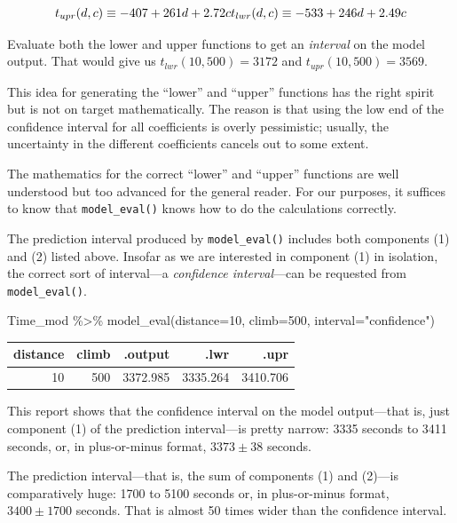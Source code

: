 \documentclass[
  letterpaper,
  DIV=11,
  numbers=noendperiod,
  oneside]{scrreprt}
\newenvironment{Shaded}{\begin{snugshade}}{\end{snugshade}}
\newcommand{\AttributeTok}[1]{\textcolor[rgb]{0.40,0.45,0.13}{#1}}
\newcommand{\DecValTok}[1]{\textcolor[rgb]{0.68,0.00,0.00}{#1}}
\newcommand{\FunctionTok}[1]{\textcolor[rgb]{0.28,0.35,0.67}{#1}}
\newcommand{\NormalTok}[1]{\textcolor[rgb]{0.00,0.23,0.31}{#1}}
\newcommand{\SpecialCharTok}[1]{\textcolor[rgb]{0.37,0.37,0.37}{#1}}
\newcommand{\StringTok}[1]{\textcolor[rgb]{0.13,0.47,0.30}{#1}}
\begin{document}
\[t_{upr}(d,c) \equiv -407 + 261 d + 2.72 c\\
t_{lwr}(d,c) \equiv -533 + 246 d + 2.49 c\]

Evaluate both the lower and upper functions to get an \emph{interval} on
the model output. That would give us \(t_{lwr}(10, 500) = 3172\) and
\(t_{upr}(10, 500) = 3569\).

This idea for generating the ``lower'' and ``upper'' functions has the
right spirit but is not on target mathematically. The reason is that
using the low end of the confidence interval for all coefficients is
overly pessimistic; usually, the uncertainty in the different
coefficients cancels out to some extent.

The mathematics for the correct ``lower'' and ``upper'' functions are
well understood but too advanced for the general reader. For our
purposes, it suffices to know that \texttt{model\_eval()} knows how to
do the calculations correctly.

The prediction interval produced by \texttt{model\_eval()} includes both
components (1) and (2) listed above. Insofar as we are interested in
component (1) in isolation, the correct sort of interval---a
\emph{confidence interval}---can be requested from
\texttt{model\_eval()}.

\begin{Shaded}
\begin{Highlighting}[]
\NormalTok{Time\_mod }\SpecialCharTok{\%\textgreater{}\%} 
    \FunctionTok{model\_eval}\NormalTok{(}\AttributeTok{distance=}\DecValTok{10}\NormalTok{, }\AttributeTok{climb=}\DecValTok{500}\NormalTok{, }\AttributeTok{interval=}\StringTok{"confidence"}\NormalTok{)}
\end{Highlighting}
\end{Shaded}

\ttfamily 
\begin{tabular}{rrrrr}
\toprule
distance & climb & .output & .lwr & .upr\\
\midrule
10 & 500 & 3372.985 & 3335.264 & 3410.706\\
\bottomrule
\end{tabular} \normalfont
\bigskip

This report shows that the confidence interval on the model
output---that is, just component (1) of the prediction interval---is
pretty narrow: 3335 seconds to 3411 seconds, or, in plus-or-minus
format, \(3373 \pm 38\) seconds.

The prediction interval---that is, the sum of components (1) and
(2)---is comparatively huge: 1700 to 5100 seconds or, in plus-or-minus
format, \(3400 \pm 1700\) seconds. That is almost 50 times wider than
the confidence interval.
\end{document}
